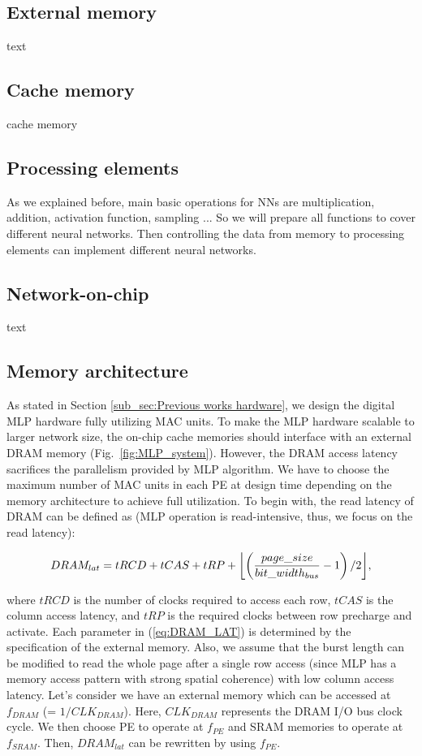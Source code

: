 \documentclass[pageno]{jpaper}
\DeclarePairedDelimiter{\floor}{\lfloor}{\rfloor}
\begin{document}
\subsection{External memory}\label{sub_sec:ext_mem}
text
\subsection{Cache memory}\label{sub_sec:cache_mem}
cache memory

\subsection{Processing elements}\label{sub_sec:pe}
As we explained before, main basic operations for NNs are multiplication, addition, activation function, sampling ... So we will prepare all functions to cover different neural networks. Then controlling the data from memory to processing elements can implement different neural networks.
\subsection{Network-on-chip}\label{sub_sec:noc}
text

\subsection{Memory architecture}\label{sub_sec:mem_arch}
As stated in Section \ref{sub_sec:Previous works hardware}, we design the digital MLP hardware fully utilizing MAC units. To make the MLP hardware scalable to larger network size, the on-chip cache memories should interface with an external DRAM memory (Fig.~\ref{fig:MLP_system}). However, the DRAM access latency sacrifices the parallelism provided by MLP algorithm. We have to choose the maximum number of MAC units in each PE at design time depending on the memory architecture to achieve full utilization.
To begin with, the read latency of DRAM can be defined as (MLP operation is read-intensive, thus, we focus on the read latency):

\begin{equation}
	DRAM_{lat} = tRCD + tCAS + tRP + \floor[\bigg]{\left(\frac{page\_size}{bit\_width_{bus}}-1\right)/2},
	\label{eq:DRAM_LAT}
\end{equation}

where $tRCD$ is the number of clocks required to access each row, $tCAS$ is the column access latency, and $tRP$ is the required clocks between row precharge and activate. Each parameter in (\ref{eq:DRAM_LAT}) is determined by the specification of the external memory. Also, we assume that the burst length can be modified to read the whole page after a single row access (since MLP has a memory access pattern with strong spatial coherence) with low column access latency. Let’s consider we have an external memory which can be accessed at $f_{DRAM}$ (= $1/CLK_{DRAM}$). Here, $CLK_{DRAM}$ represents the DRAM I/O bus clock cycle. We then choose PE to operate at $f_{PE}$ and SRAM memories to operate at $f_{SRAM}$. Then, $DRAM_{lat}$ can be rewritten by using $f_{PE}$.
\end{document}
